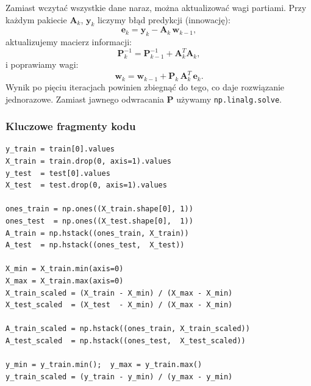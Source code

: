 \documentclass[12pt, a4paper]{article}
\begin{document}
Zamiast wczytać wszystkie dane naraz, można aktualizować wagi partiami.
Przy każdym pakiecie $\mathbf{A}_k$, $\mathbf{y}_k$ liczymy błąd predykcji
(innowację):
\begin{equation}
  \mathbf{e}_k = \mathbf{y}_k - \mathbf{A}_k\,\mathbf{w}_{k-1},
\end{equation}
aktualizujemy macierz informacji:
\begin{equation}
  \mathbf{P}_k^{-1} = \mathbf{P}_{k-1}^{-1} + \mathbf{A}_k^T\mathbf{A}_k,
\end{equation}
i poprawiamy wagi:
\begin{equation}
  \mathbf{w}_k = \mathbf{w}_{k-1}
    + \mathbf{P}_k\,\mathbf{A}_k^T\,\mathbf{e}_k.
\end{equation}
Wynik po pięciu iteracjach powinien zbiegnąć do tego, co daje rozwiązanie
jednorazowe. Zamiast jawnego odwracania $\mathbf{P}$ używamy \texttt{np.linalg.solve}.

\subsubsection{Kluczowe fragmenty kodu}

\begin{lstlisting}[caption={Budowa macierzy i normalizacja}]
y_train = train[0].values
X_train = train.drop(0, axis=1).values
y_test  = test[0].values
X_test  = test.drop(0, axis=1).values

ones_train = np.ones((X_train.shape[0], 1))
ones_test  = np.ones((X_test.shape[0],  1))
A_train = np.hstack((ones_train, X_train))
A_test  = np.hstack((ones_test,  X_test))

X_min = X_train.min(axis=0)
X_max = X_train.max(axis=0)
X_train_scaled = (X_train - X_min) / (X_max - X_min)
X_test_scaled  = (X_test  - X_min) / (X_max - X_min)

A_train_scaled = np.hstack((ones_train, X_train_scaled))
A_test_scaled  = np.hstack((ones_test,  X_test_scaled))

y_min = y_train.min();  y_max = y_train.max()
y_train_scaled = (y_train - y_min) / (y_max - y_min)
\end{lstlisting}
\end{document}
